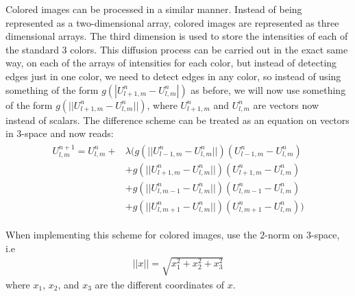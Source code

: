 Colored images can be processed in a similar manner.
Instead of being represented as a two-dimensional array, colored images are represented as three dimensional arrays.
The third dimension is used to store the intensities of each of the standard 3 colors.
This diffusion process can be carried out in the exact same way, on each of the arrays of intensities for each color, but instead of detecting edges just in one color, we need to detect edges in any color, so instead of using something of the form $g(|U_{l+1,m}^n - U_{l,m}^n|)$ as before, we will now use something of the form $g(||U_{l+1,m}^n - U_{l,m}^n||)$, where $U_{l+1,m}^n$ and $U_{l,m}^n$ are vectors now instead of scalars.
The difference scheme can be treated as an equation on vectors in 3-space and now reads:
\begin{align}
\begin{split}
U_{l,m}^{n+1} = U_{l,m}^n + & \lambda (g(||U_{l-1,m}^n - U_{l,m}^n||)(U_{l-1,m}^n - U_{l,m}^n) \\
					& + g(||U_{l+1,m}^n - U_{l,m}^n||)(U_{l+1,m}^n - U_{l,m}^n) \\
					& + g(||U_{l,m-1}^n - U_{l,m}^n||)(U_{l,m-1}^n - U_{l,m}^n) \\
					& + g(||U_{l,m+1}^n - U_{l,m}^n||)(U_{l,m+1}^n - U_{l,m}^n))
\end{split}
\label{eqn:anisotropic:diffuse_image}
\end{align}

When implementing this scheme for colored images, use the $2$-norm on 3-space, i.e
\begin{align}
||x||=\sqrt{x_1^2+x_2^2+x_3^2}
\label{eqn:anisotropic:2norm_3space}
\end{align}
 where $x_1$, $x_2$, and $x_3$ are the different coordinates of $x$.

